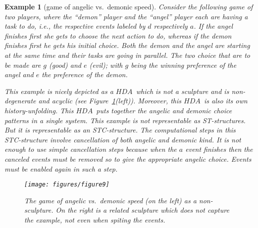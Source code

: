 \documentclass[submission,copyright,creativecommons]{eptcs}
\newtheorem{example}[theorem]{Example}
\newcommand\HDA{\ensuremath{\mathit{HDA}}}
\begin{document}
\begin{example}[game of angelic vs.\ demonic speed]\label{ex_game_angelic_vs_demonic}
Consider the following game of two players, where the ``demon'' player and the ``angel'' player each are having a task to do, i.e., the respective events labeled by $d$ respectively $a$. If the angel finishes first she gets to choose the next action to do, whereas if the demon finishes first he gets his initial choice. Both the demon and the angel are starting at the same time and their tasks are going in parallel. The two choice that are to be made are $g$ (good) and $e$ (evil); with $g$ being the winning preference of the angel and $e$ the preference of the demon.

This example is nicely depicted as a \HDA\ which is not a sculpture and is non-degenerate and acyclic (see Figure~\ref{fig_ex_angelicdemonic_game}(left)). Moreover, this \HDA\ is also its own history-unfolding. This \HDA\ puts together the angelic and demonic choice patterns in a single system. This example is not representable as ST-structures.
But it is representable as an STC-structure.
The computational steps in this STC-structure involve cancellation of both angelic and demonic kind. It is not enough to use simple cancellation steps because when the $a$ event finishes then the canceled events must be removed so to give the appropriate angelic choice. Events must be enabled again in such a step.

\begin{figure}[tp]
  \begin{center}
    \hspace{-2ex}\texttt{[image: figures/figure9]}
  \end{center}
\caption{The game of angelic vs.\ demonic speed (on the left) as a non-sculpture. \newline On the right is a related sculpture which does not capture the example, not even when spiting the events.
}
\label{fig_ex_angelicdemonic_game}
\end{figure}
\end{example}
\end{document}
